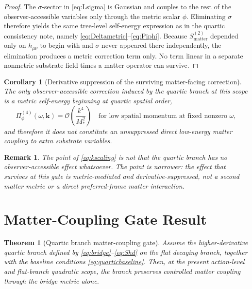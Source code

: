 \documentclass[11pt]{article}
\newtheorem{remark}{Remark}
\newtheorem{corollary}{Corollary}
\newtheorem{theorem}{Theorem}
\begin{document}
\begin{proof}
The \(\sigma\)-sector in \eqref{eq:Lsigma} is Gaussian and couples to the rest of the observer-accessible variables only through the metric scalar \(\phi\). Eliminating \(\sigma\) therefore yields the same tree-level self-energy expression as in the quartic consistency note, namely \eqref{eq:Deltametric}--\eqref{eq:Piphi}. Because \(S_{\mathrm{matter}}^{(2)}\) depended only on \(h_{\mu\nu}\) to begin with and \(\sigma\) never appeared there independently, the elimination produces a metric correction term only. No term linear in a separate nonmetric substrate field times a matter operator can survive.
\end{proof}

\begin{corollary}[Derivative suppression of the surviving matter-facing correction]
The only observer-accessible correction induced by the quartic branch at this scope is a metric self-energy beginning at quartic spatial order,
\begin{equation}
\Pi_\phi^{(4)}(\omega,\mathbf{k})
=
\mathcal O\!\left(\frac{k^4}{M_*^2}\right)
\quad
\text{for low spatial momentum at fixed nonzero }\omega,
\label{eq:kscaling}
\end{equation}
and therefore it does not constitute an unsuppressed direct low-energy matter coupling to extra substrate variables.
\end{corollary}

\begin{remark}
The point of \eqref{eq:kscaling} is not that the quartic branch has no observer-accessible effect whatsoever. The point is narrower: the effect that survives at this gate is metric-mediated and derivative-suppressed, not a second matter metric or a direct preferred-frame matter interaction.
\end{remark}

\section{Matter-Coupling Gate Result}

\begin{theorem}[Quartic branch matter-coupling gate]
Assume the higher-derivative quartic branch defined by \eqref{eq:bridge}--\eqref{eq:Shd} on the flat decaying branch, together with the baseline conditions \eqref{eq:quarticbaseline}. Then, at the present action-level and flat-branch quadratic scope, the branch preserves controlled matter coupling through the bridge metric alone.
\end{theorem}
\end{document}
